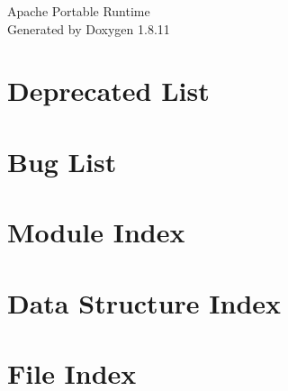 \documentclass[twoside]{book}
\newcommand{\+}{\discretionary{\mbox{\scriptsize$\hookleftarrow$}}{}{}}
\newcommand{\clearemptydoublepage}{%
  \newpage{\pagestyle{empty}\cleardoublepage}%
}
\begin{document}
\hypersetup{pageanchor=false,
             bookmarksnumbered=true,
             pdfencoding=unicode
            }
\begin{titlepage}
\vspace*{7cm}
\begin{center}%
{\Large Apache Portable Runtime }\\
\vspace*{1cm}
{\large Generated by Doxygen 1.8.11}\\
\end{center}
\end{titlepage}
\clearemptydoublepage
\tableofcontents
\clearemptydoublepage
{}
\hypersetup{pageanchor=true}

\chapter{Deprecated List}
\label{deprecated}
\hypertarget{deprecated}{}

\chapter{Bug List}
\label{bug}
\hypertarget{bug}{}

\chapter{Module Index}

\chapter{Data Structure Index}

\chapter{File Index}

\end{document}
